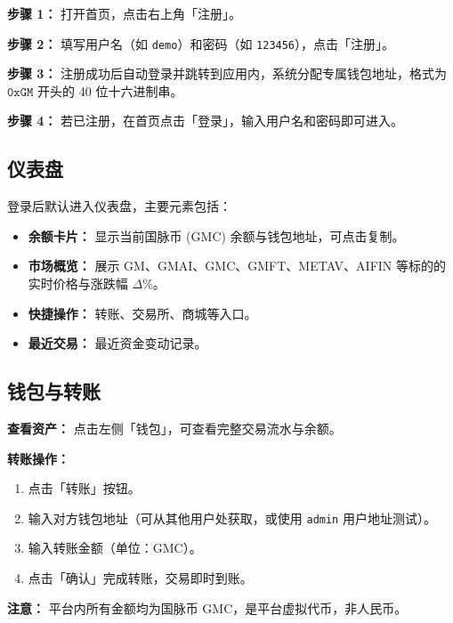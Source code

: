 \documentclass[12pt,a4paper]{article}
\begin{document}
\textbf{步骤 1：} 打开首页，点击右上角「注册」。

\textbf{步骤 2：} 填写用户名（如 \texttt{demo}）和密码（如 \texttt{123456}），点击「注册」。

\textbf{步骤 3：} 注册成功后自动登录并跳转到应用内，系统分配专属钱包地址，格式为 $\mathtt{0xGM}$ 开头的 40 位十六进制串。

\textbf{步骤 4：} 若已注册，在首页点击「登录」，输入用户名和密码即可进入。

\subsection{仪表盘}

登录后默认进入仪表盘，主要元素包括：

\begin{itemize}
\item \textbf{余额卡片：} 显示当前国脉币 (GMC) 余额与钱包地址，可点击复制。
\item \textbf{市场概览：} 展示 GM、GMAI、GMC、GMFT、METAV、AIFIN 等标的的实时价格与涨跌幅 $\Delta\%$。
\item \textbf{快捷操作：} 转账、交易所、商城等入口。
\item \textbf{最近交易：} 最近资金变动记录。
\end{itemize}

\subsection{钱包与转账}

\textbf{查看资产：} 点击左侧「钱包」，可查看完整交易流水与余额。

\textbf{转账操作：}
\begin{enumerate}
\item 点击「转账」按钮。
\item 输入对方钱包地址（可从其他用户处获取，或使用 \texttt{admin} 用户地址测试）。
\item 输入转账金额（单位：GMC）。
\item 点击「确认」完成转账，交易即时到账。
\end{enumerate}

\textbf{注意：} 平台内所有金额均为国脉币 GMC，是平台虚拟代币，非人民币。
\end{document}
